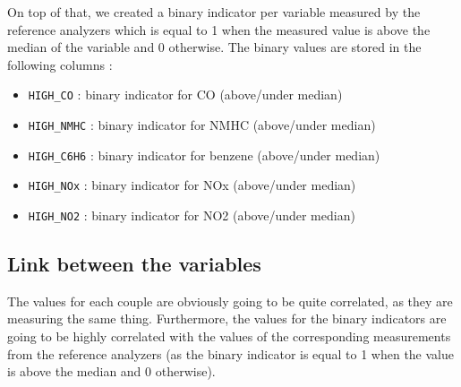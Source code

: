 On top of that, we created a binary indicator per variable measured by the reference analyzers which is equal to 1 when the measured value is above the median of the variable and 0 otherwise.
The binary values are stored in the following columns :

\begin{itemize}
  \item \texttt{HIGH\_CO} : binary indicator for CO (above/under median)
  \item \texttt{HIGH\_NMHC} : binary indicator for NMHC (above/under median)
  \item \texttt{HIGH\_C6H6} : binary indicator for benzene (above/under median)
  \item \texttt{HIGH\_NOx} : binary indicator for NOx (above/under median)
  \item \texttt{HIGH\_NO2} : binary indicator for NO2 (above/under median)
\end{itemize}

\subsection{Link between the variables}
The values for each couple are obviously going to be quite correlated, as they are measuring the same thing.
Furthermore, the values for the binary indicators are going to be highly correlated with the values of the corresponding measurements from the reference analyzers (as the binary indicator is equal to 1 when the value is above the median and 0 otherwise).